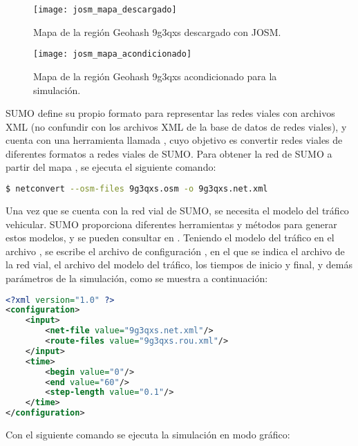 \begin{figure}[th!]
\centering
\texttt{[image: josm\_mapa\_descargado]} 
\decoRule
\caption[Mapa de la región Geohash 9g3qxs descargado con JOSM]{Mapa de la
región Geohash 9g3qxs descargado con JOSM.}
\label{fig:josm_mapa_descargado}
\end{figure}

\begin{figure}[th!]
\centering
\texttt{[image: josm\_mapa\_acondicionado]}
\decoRule
\caption[Mapa de la región Geohash 9g3qxs acondicionado para la
simulación]{Mapa de la región Geohash 9g3qxs acondicionado para la simulación.}
\label{fig:josm_mapa_acondicionado}
\end{figure}

SUMO define su propio formato para representar las redes viales con archivos
XML (no confundir con los archivos XML de la base de datos de redes viales), y
cuenta con una herramienta llamada , cuyo objetivo es convertir
redes viales de diferentes formatos a redes viales de SUMO. Para obtener la red
de SUMO  a partir del mapa , se ejecuta el
siguiente comando:

\begin{lstlisting}[language=bash]
$ netconvert --osm-files 9g3qxs.osm -o 9g3qxs.net.xml
\end{lstlisting}

Una vez que se cuenta con la red vial de SUMO, se necesita el modelo del tráfico
vehicular. SUMO proporciona diferentes herramientas y métodos para generar
estos modelos, y se pueden consultar en \cite{SUMOTrafico}. Teniendo el modelo
del tráfico en el archivo , se escribe el archivo de
configuración , en el que se indica el archivo de la
red vial, el archivo del modelo del tráfico, los tiempos de inicio y final, y
demás parámetros de la simulación, como se muestra a continuación:

\begin{lstlisting}[language=XML]
<?xml version="1.0" ?>
<configuration>
    <input>
        <net-file value="9g3qxs.net.xml"/>
        <route-files value="9g3qxs.rou.xml"/>
    </input>
    <time>
        <begin value="0"/>
        <end value="60"/>
        <step-length value="0.1"/>
    </time>
</configuration>
\end{lstlisting}

Con el siguiente comando se ejecuta la simulación en modo gráfico:

